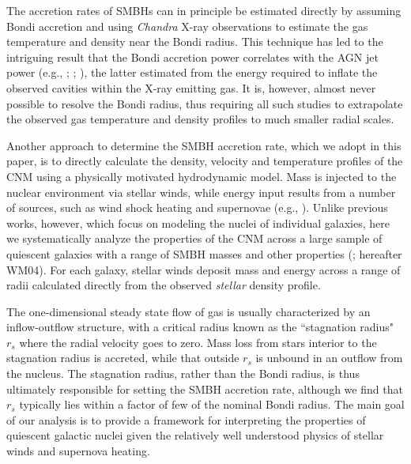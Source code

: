 \documentclass[usenatbib,fleqn]{mn2e}
\newcommand{\rs}{r_s}
\begin{document}
The accretion rates of SMBHs can in principle be estimated directly by
assuming Bondi accretion and using {\it Chandra} X-ray observations to
estimate the gas temperature and density near the Bondi radius.  This
technique has led to the intriguing result that the Bondi accretion
power correlates with the AGN jet power (e.g.,
\citealt{AllenDunn+:2006a}; \citealt{Russell+13};
\citealt{FujitaKawakatu+:2014a}), the latter estimated from the energy
required to inflate the observed cavities within the X-ray emitting
gas.  It is, however, almost never possible to resolve the Bondi
radius, thus requiring all such studies to extrapolate the observed
gas temperature and density profiles to much smaller radial scales.

Another approach to determine the SMBH accretion rate, which we adopt
in this paper, is to directly calculate the density, velocity and
temperature profiles of the CNM using a physically motivated
hydrodynamic model.  Mass is injected to the nuclear environment via
stellar winds, while energy input results from a number of sources,
such as wind shock heating and supernovae (e.g.,
\citealt{Quataert:2004a,De-ColleGuillochon+:2012a,ShcherbakovWong+:2014a}).
Unlike previous works, however, which focus on modeling the nuclei of
individual galaxies, here we systematically analyze the properties of
the CNM across a large sample of quiescent galaxies with a range of
SMBH masses and other properties (\citealt{WangMerritt:2004a};
hereafter WM04).  For each galaxy, stellar winds deposit mass and
energy across a range of radii calculated directly from the observed
{\it stellar} density profile.

The one-dimensional steady state flow of gas is usually characterized
by an inflow-outflow structure, with a critical radius known as the
``stagnation radius" $\rs$ where the radial velocity goes to zero.
Mass loss from stars interior to the stagnation radius is accreted,
while that outside $\rs$ is unbound in an outflow from the nucleus.
The stagnation radius, rather than the Bondi radius, is thus
ultimately responsible for setting the SMBH accretion rate, although
we find that $\rs$ typically lies within a factor of few of the
nominal Bondi radius.
The main goal of our analysis is to provide a framework for
interpreting the properties of quiescent galactic nuclei given the
relatively well understood physics of stellar winds and supernova
heating.
\end{document}
